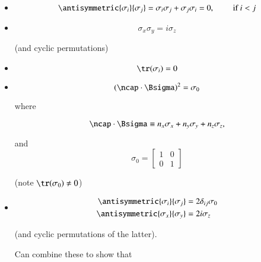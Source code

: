 \begin{itemize}
\item 

\begin{equation}\label{eqn:qmTwoL14:490}
\antisymmetric{\sigma_i}{\sigma_j} = \sigma_i \sigma_j + \sigma_j \sigma_i = 0, \qquad \mbox{ if $i < j$}
\end{equation}

\item

\begin{equation}\label{eqn:qmTwoL14:860}
\sigma_x \sigma_y = i \sigma_z
\end{equation}

(and cyclic permutations)

\item 
\begin{equation}\label{eqn:qmTwoL14:880}
\tr(\sigma_i) = 0
\end{equation}

\item

\begin{equation}\label{eqn:qmTwoL14:900}
(\ncap \cdot \Bsigma)^2 = \sigma_0
\end{equation}

where 

\begin{equation}\label{eqn:qmTwoL14:510}
\ncap \cdot \Bsigma \equiv n_x \sigma_x + n_y \sigma_y + n_z \sigma_z,
\end{equation}

and
\begin{equation}\label{eqn:qmTwoL14:530}
\sigma_0 = 
\begin{bmatrix}
1 & 0 \\
0 & 1
\end{bmatrix}
\end{equation}

(note $\tr(\sigma_0) \ne 0$)

\item

\begin{align}\label{eqn:qmTwoL14:550}
\antisymmetric{\sigma_i}{\sigma_j} &= 2 \delta_{ij} \sigma_0 \\
\antisymmetric{\sigma_x}{\sigma_y} &= 2 i \sigma_z
\end{align}

(and cyclic permutations of the latter).

Can combine these to show that 


\end{itemize}
